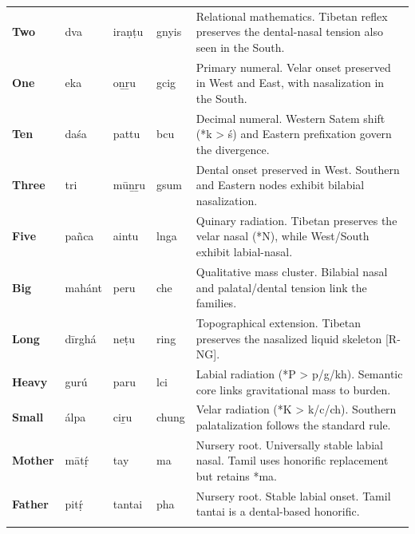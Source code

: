 \documentclass[11pt,oneside,openany]{book}
\begin{document}
\begin{longtable}{p{} p{} p{} p{} p{}}
\textbf{Two} & dva & iraṇṭu & gnyis & \small Relational mathematics. Tibetan reflex preserves the dental-nasal tension also seen in the South. \\ 
\addlinespace[10pt]

\textbf{One} & eka & oṉṟu & gcig & \small Primary numeral. Velar onset preserved in West and East, with nasalization in the South. \\ 
\addlinespace[10pt]

\textbf{Ten} & daśa & pattu & bcu & \small Decimal numeral. Western Satem shift (*k > ś) and Eastern prefixation govern the divergence. \\ 
\addlinespace[10pt]

\textbf{Three} & tri & mūṉṟu & gsum & \small Dental onset preserved in West. Southern and Eastern nodes exhibit bilabial nasalization. \\ 
\addlinespace[10pt]

\textbf{Five} & pañca & aintu & lnga & \small Quinary radiation. Tibetan preserves the velar nasal (*N), while West/South exhibit labial-nasal. \\ 
\addlinespace[10pt]

\textbf{Big} & mahánt & peru & che & \small Qualitative mass cluster. Bilabial nasal and palatal/dental tension link the families. \\ 
\addlinespace[10pt]

\textbf{Long} & dīrghá & neṭu & ring & \small Topographical extension. Tibetan preserves the nasalized liquid skeleton [R-NG]. \\ 
\addlinespace[10pt]

\textbf{Heavy} & gurú & paru & lci & \small Labial radiation (*P > p/g/kh). Semantic core links gravitational mass to burden. \\ 
\addlinespace[10pt]

\textbf{Small} & álpa & ciṟu & chung & \small Velar radiation (*K > k/c/ch). Southern palatalization follows the standard rule. \\ 
\addlinespace[10pt]

\textbf{Mother} & mātṛ́ & tay & ma & \small Nursery root. Universally stable labial nasal. Tamil uses honorific replacement but retains *ma. \\ 
\addlinespace[10pt]

\textbf{Father} & pitṛ́ & tantai & pha & \small Nursery root. Stable labial onset. Tamil tantai is a dental-based honorific. \\ 
\addlinespace[10pt]


\end{longtable}
\end{document}
